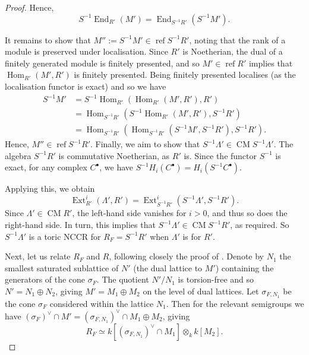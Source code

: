 \documentclass[reqno, 12pt]{amsart}
\theoremstyle{definition}
\numberwithin{equation}{section}
\newcommand{\Hom}{\operatorname{Hom}}
\newcommand{\End}{\operatorname{End}}
\newcommand{\Ext}{\operatorname{Ext}}
\begin{document}
\begin{proof}
    Hence, \[
    S^{-1}\End_{R'}(M')=\End_{S^{-1}R'}(S^{-1}M').
    \]

    It remains to show that $M'':=S^{-1}M'\in \operatorname{ref}S^{-1}R'$, noting that the rank of a module is preserved under localisation. Since $R'$ is Noetherian, the dual of a finitely generated module is finitely presented, and so $M'\in\operatorname{ref}R'$ implies that $\Hom_{R'}(M',R')$ is finitely presented. Being finitely presented localises (as the localisation functor is exact) and so we have
    \begin{align*}
        S^{-1}M' &=S^{-1}\Hom_{R'}(\Hom_{R'}(M',R'),R')\\
        &=\Hom_{S^{-1}R'}(S^{-1}\Hom_{R'}(M',R'),S^{-1}R')\\
        & = \Hom_{S^{-1}R'}(\Hom_{S^{-1}R'}(S^{-1}M',S^{-1}R'),S^{-1}R').
    \end{align*}
    Hence, $M''\in\operatorname{ref}S^{-1}R'$.
    Finally, we aim to show that $S^{-1}\Lambda'\in\operatorname{CM}S^{-1}\Lambda'$. The algebra $S^{-1}R'$ is commutative Noetherian, as $R'$ is. Since the functor $S^{-1}$ is exact, for any complex $C^\bullet$, we have $S^{-1}H_i(C^\bullet)=H_i(S^{-1}C^\bullet)$. 
    
    Applying this, we obtain \[
    \Ext_{R'}^i(\Lambda',R')=\Ext_{S^{-1}R'}^i(S^{-1}\Lambda',S^{-1}R').
    \]
    Since $\Lambda'\in\operatorname{CM}R'$, the left-hand side vanishes for $i>0$, and thus so does the right-hand side. In turn, this implies that $S^{-1}\Lambda'\in\operatorname{CM}S^{-1}R'$, as required. So $S^{-1}\Lambda'$ is a toric NCCR for $R_F=S^{-1}R'$ when $\Lambda'$ is for $R'$. 
    
   \noindent Next, let us relate $R_F$ and $R$, following closely the proof of \cite[Theorem 1.3.12]{CLS}. Denote by $N_1$ the smallest saturated sublattice of $N'$ (the dual lattice to $M'$) containing the generators of the cone $\sigma_F$. The quotient $N'/N_1$ is torsion-free and so $N'=N_1\oplus N_2$, giving $M'=M_1\oplus M_2$ on the level of dual lattices. Let $\sigma_{F,N_1}$ be the cone $\sigma_F$ considered within the lattice $N_1$. Then for the relevant semigroups we have $(\sigma_F)^\vee\cap M'=(\sigma_{F,N_1})^\vee\cap M_1\oplus M_2$, giving \[R_F\simeq k[(\sigma_{F,N_1})^\vee\cap M_1]\otimes_k k[M_2]. \]
    

\end{proof}
\end{document}
